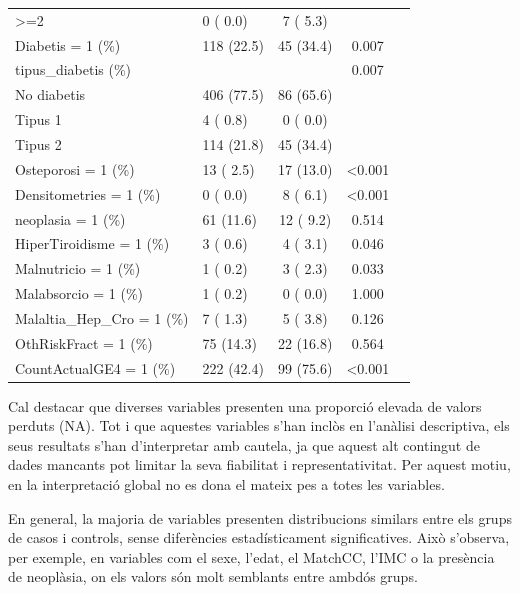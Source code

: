 \documentclass[
]{article}
\begin{document}
\begin{longtable}[t]{llccc}
\hspace{1em}>=2 & 0 ( 0.0) & 7 ( 5.3) &  & \\
\hspace{1em}Diabetis = 1 (\%) & 118 (22.5) & 45 (34.4) & 0.007 & \\
tipus\_diabetis (\%) &  &  & 0.007 & \\
\addlinespace
No diabetis & 406 (77.5) & 86 (65.6) &  & \\
\hspace{1em}Tipus 1 & 4 ( 0.8) & 0 ( 0.0) &  & \\
\hspace{1em}Tipus 2 & 114 (21.8) & 45 (34.4) &  & \\
\hspace{1em}Osteporosi = 1 (\%) & 13 ( 2.5) & 17 (13.0) & <0.001 & \\
Densitometries = 1 (\%) & 0 ( 0.0) & 8 ( 6.1) & <0.001 & \\
\addlinespace
neoplasia = 1 (\%) & 61 (11.6) & 12 ( 9.2) & 0.514 & \\
HiperTiroidisme = 1 (\%) & 3 ( 0.6) & 4 ( 3.1) & 0.046 & \\
Malnutricio = 1 (\%) & 1 ( 0.2) & 3 ( 2.3) & 0.033 & \\
Malabsorcio = 1 (\%) & 1 ( 0.2) & 0 ( 0.0) & 1.000 & \\
Malaltia\_Hep\_Cro = 1 (\%) & 7 ( 1.3) & 5 ( 3.8) & 0.126 & \\
\addlinespace
OthRiskFract = 1 (\%) & 75 (14.3) & 22 (16.8) & 0.564 & \\
CountActualGE4 = 1 (\%) & 222 (42.4) & 99 (75.6) & <0.001 & \\
\bottomrule
\end{longtable}

Cal destacar que diverses variables presenten una proporció elevada de
valors perduts (NA). Tot i que aquestes variables s'han inclòs en
l'anàlisi descriptiva, els seus resultats s'han d'interpretar amb
cautela, ja que aquest alt contingut de dades mancants pot limitar la
seva fiabilitat i representativitat. Per aquest motiu, en la
interpretació global no es dona el mateix pes a totes les variables.

En general, la majoria de variables presenten distribucions similars
entre els grups de casos i controls, sense diferències estadísticament
significatives. Això s'observa, per exemple, en variables com el sexe,
l'edat, el MatchCC, l'IMC o la presència de neoplàsia, on els valors són
molt semblants entre ambdós grups.
\end{document}
